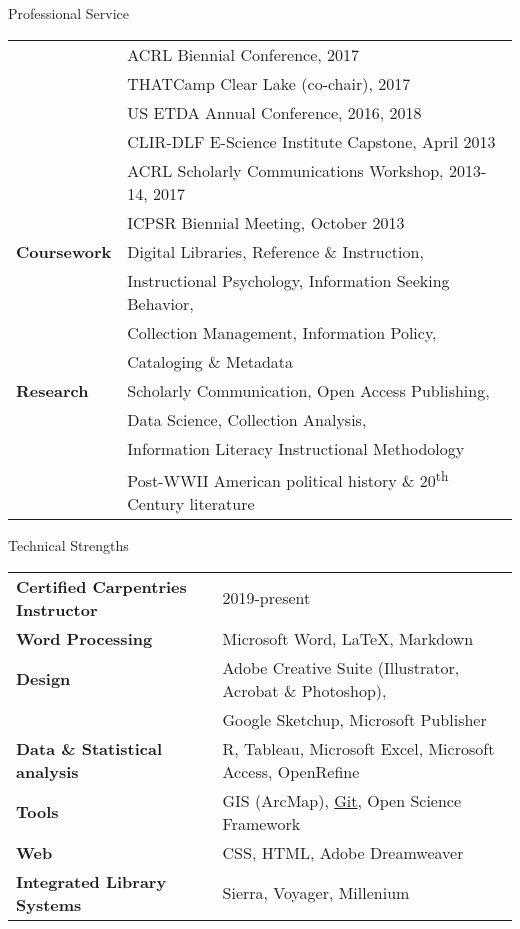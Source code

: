 \documentclass{resume} %
\begin{document}
\begin{rSection}{Professional Service}
\begin{tabular}{ @{} >{\bfseries}l @{\hspace{2ex}} l }
	 & ACRL Biennial Conference, 2017 \\
	 & THATCamp Clear Lake (co-chair), 2017 \\
	 & US ETDA Annual Conference, 2016, 2018 \\
	 & CLIR-DLF E-Science Institute Capstone, April 2013 \\
	 & ACRL Scholarly Communications Workshop, 2013-14, 2017 \\
	 & ICPSR Biennial Meeting, October 2013 \\
Coursework & Digital Libraries, Reference \& Instruction, \\
 & Instructional Psychology, Information Seeking Behavior, \\
 & Collection Management, Information Policy, \\
 & Cataloging \& Metadata \\
Research & Scholarly Communication, Open Access Publishing, \\
 & Data Science, Collection Analysis, \\
 & Information Literacy Instructional Methodology \\
 & Post-WWII American political history \& 20\textsuperscript{th} Century literature

\end{tabular}

\end{rSection}



\begin{rSection}{Technical Strengths}

\begin{tabular}{ @{} >{\bfseries}l @{\hspace{2ex}} l }
Certified Carpentries Instructor & 2019-present \\
Word Processing & Microsoft Word, \LaTeX, Markdown \\
Design & Adobe Creative Suite (Illustrator, Acrobat \& Photoshop), \\
  & Google Sketchup, Microsoft Publisher \\
Data \& Statistical analysis & R, Tableau, Microsoft Excel, Microsoft Access, OpenRefine \\
Tools & GIS (ArcMap), \href{https://github.com/ciakovx}{Git}, Open Science Framework \\
Web & CSS, HTML, Adobe Dreamweaver \\
Integrated Library Systems & Sierra, Voyager, Millenium \\
\end{tabular}

\end{rSection}
\end{document}
